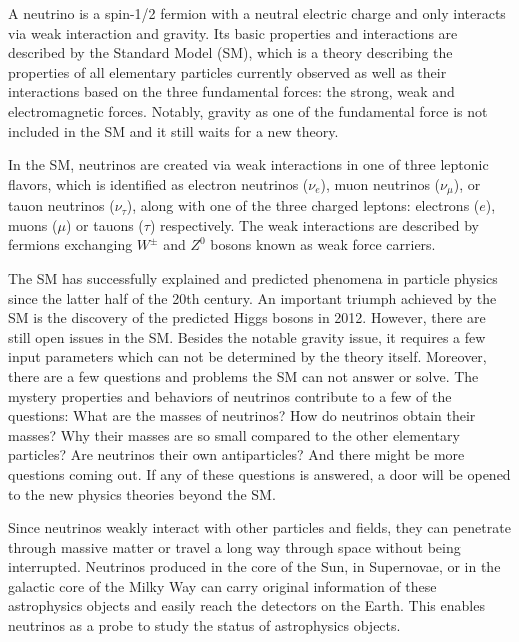 
A neutrino is a spin-1/2 fermion with a neutral electric charge and only interacts via weak interaction and gravity. Its basic properties and interactions are described by the Standard Model (SM), which is a theory describing the properties of all elementary particles currently observed as well as their interactions based on the three fundamental forces: the strong, weak and electromagnetic forces. Notably, gravity as one of the fundamental force is not included in the SM and it still waits for a new theory. 

In the SM, neutrinos are created via weak interactions in one of three leptonic flavors, which is identified as electron neutrinos ($\nu_e$), muon neutrinos ($\nu_\mu$), or tauon neutrinos ($\nu_\tau$), along with one of the three charged leptons: electrons ($e$), muons ($\mu$) or tauons ($\tau$) respectively. The weak interactions are described by fermions exchanging $W^{\pm}$ and $Z^0$ bosons known as weak force carriers.

The SM has successfully explained and predicted phenomena in particle physics since the latter half of the 20th century. An important triumph achieved by the SM is the discovery of the predicted Higgs bosons in 2012. However, there are still open issues in the SM. Besides the notable gravity issue, it requires a few input parameters which can not be determined by the theory itself. Moreover, there are a few questions and problems the SM can not answer or solve. The mystery properties and behaviors of neutrinos contribute to a few of the questions: What are the masses of neutrinos? How do neutrinos obtain their masses? Why their masses are so small compared to the other elementary particles? Are neutrinos their own antiparticles? And there might be more questions coming out. If any of these questions is answered, a door will be opened to the new physics theories beyond the SM.

Since neutrinos weakly interact with other particles and fields, they can penetrate through massive matter or travel a long way through space without being interrupted. Neutrinos produced in the core of the Sun, in Supernovae, or in the galactic core of the Milky Way can carry original information of these astrophysics objects and easily reach the detectors on the Earth. This enables neutrinos as a probe to study the status of astrophysics objects.

